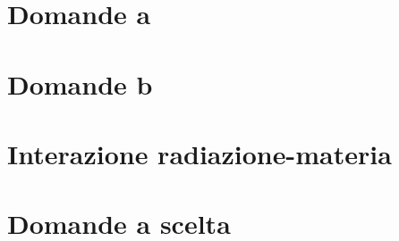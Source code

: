 \documentclass[10pt,a4paper]{article}
\begin{document}
\section{Domande a}
\section{Domande b}



\section{Interazione radiazione-materia}
\setcounter{section}{0}
\renewcommand*{\theHsection}{chX.\the\value{section}}


\section{Domande a scelta}
 
\end{document}
